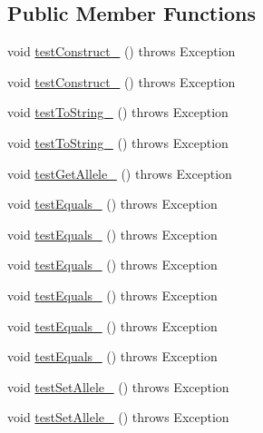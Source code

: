 \subsection*{Public Member Functions}
\begin{DoxyCompactItemize}
\item 
void \hyperlink{classorg_1_1jgap_1_1impl_1_1_set_gene_test_af8949675ba0fdbb6eb0309f39f0ce8ae}{test\-Construct\-\_} ()  throws Exception 
\item 
void \hyperlink{classorg_1_1jgap_1_1impl_1_1_set_gene_test_a4dbefadb643514e549c0ca60cae975eb}{test\-Construct\-\_} ()  throws Exception 
\item 
void \hyperlink{classorg_1_1jgap_1_1impl_1_1_set_gene_test_a98553b5f28580d0c8de7fa044773ab21}{test\-To\-String\-\_} ()  throws Exception 
\item 
void \hyperlink{classorg_1_1jgap_1_1impl_1_1_set_gene_test_a0fb9dca147686f73069f77a77bdaa111}{test\-To\-String\-\_} ()  throws Exception 
\item 
void \hyperlink{classorg_1_1jgap_1_1impl_1_1_set_gene_test_aeb21f4416a05004539579bd66368c431}{test\-Get\-Allele\-\_} ()  throws Exception 
\item 
void \hyperlink{classorg_1_1jgap_1_1impl_1_1_set_gene_test_a1f090c4309fb1cb34ad92259b0dc2377}{test\-Equals\-\_} ()  throws Exception 
\item 
void \hyperlink{classorg_1_1jgap_1_1impl_1_1_set_gene_test_a3bdb78655c3ee34274a9181106322a88}{test\-Equals\-\_} ()  throws Exception 
\item 
void \hyperlink{classorg_1_1jgap_1_1impl_1_1_set_gene_test_a9c60da46d532e5d1edd5d39946f755df}{test\-Equals\-\_} ()  throws Exception 
\item 
void \hyperlink{classorg_1_1jgap_1_1impl_1_1_set_gene_test_a4b5d1cd524a7a5fe438ad950d16ca9bf}{test\-Equals\-\_} ()  throws Exception 
\item 
void \hyperlink{classorg_1_1jgap_1_1impl_1_1_set_gene_test_a572283a80cfcb7c6cd2b082c6233791e}{test\-Equals\-\_} ()  throws Exception 
\item 
void \hyperlink{classorg_1_1jgap_1_1impl_1_1_set_gene_test_a7fedc2f8235f180e6aa3989f8ffab31c}{test\-Equals\-\_} ()  throws Exception 
\item 
void \hyperlink{classorg_1_1jgap_1_1impl_1_1_set_gene_test_acc2084d3ce9305e5c5d8e6c23cdb0026}{test\-Set\-Allele\-\_} ()  throws Exception 
\item 
void \hyperlink{classorg_1_1jgap_1_1impl_1_1_set_gene_test_ac7d8c6760380245634a9e47113dae076}{test\-Set\-Allele\-\_} ()  throws Exception 

\end{DoxyCompactItemize}
